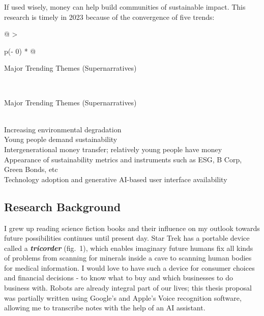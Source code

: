 \documentclass[
  letterpaper,
  DIV=11,
  numbers=noendperiod]{scrartcl}
\begin{document}
If used wisely, money can help build communities of sustainable impact.
This research is timely in 2023 because of the convergence of five
trends:

\begin{longtable}[]{@{}
  >{\raggedright\arraybackslash}p{(\columnwidth - 0\tabcolsep) * }@{}}
\caption{Current trends backing the relevance of this research
project.}\tabularnewline
\toprule\noalign{}
\begin{minipage}[b]{\linewidth}\raggedright
Major Trending Themes (Supernarratives)
\end{minipage} \\
\midrule\noalign{}
\endfirsthead
\toprule\noalign{}
\begin{minipage}[b]{\linewidth}\raggedright
Major Trending Themes (Supernarratives)
\end{minipage} \\
\midrule\noalign{}
\endhead
\bottomrule\noalign{}
\endlastfoot
Increasing environmental degradation \\
Young people demand sustainability \\
Intergenerational money transfer; relatively young people have money \\
Appearance of sustainability metrics and instruments such as ESG, B
Corp, Green Bonds, etc \\
Technology adoption and generative AI-based user interface
availability \\
\end{longtable}

\subsection{Research Background}\label{research-background}

I grew up reading science fiction books and their influence on my
outlook towards future possibilities continues until present day. Star
Trek has a portable device called a \textbf{\emph{tricorder}} (fig.~1),
which enables imaginary future humans fix all kinds of problems from
scanning for minerals inside a cave to scanning human bodies for medical
information. I would love to have such a device for consumer choices and
financial decisions - to know what to buy and which businesses to do
business with. Robots are already integral part of our lives; this
thesis proposal was partially written using Google's and Apple's Voice
recognition software, allowing me to transcribe notes with the help of
an AI assistant.
\end{document}
